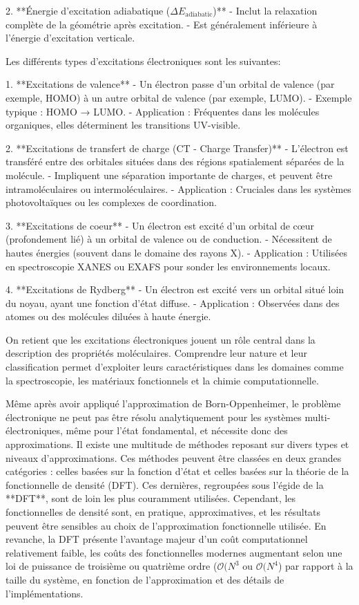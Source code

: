 \documentclass[12pt,a4paper]{report}
\numberwithin{equation}{section}
\numberwithin{figure}{section}
\numberwithin{table}{section}
\begin{document}
\begin{markdown}
2. **Énergie d'excitation adiabatique ($ \Delta E_{\text{adiabatic}} $)**
   - Inclut la relaxation complète de la géométrie après excitation.
   - Est généralement inférieure à l'énergie d'excitation verticale.

Les différents types d'excitations électroniques sont les suivantes:

1. **Excitations de valence**
   - Un électron passe d'un orbital de valence (par exemple, HOMO) à un autre orbital de valence (par exemple, LUMO).
   - Exemple typique : HOMO → LUMO.
   - Application : Fréquentes dans les molécules organiques, elles déterminent les transitions UV-visible.

2. **Excitations de transfert de charge (CT - Charge Transfer)**
   - L'électron est transféré entre des orbitales situées dans des régions spatialement séparées de la molécule.
   - Impliquent une séparation importante de charges, et peuvent être intramoléculaires ou intermoléculaires.
   - Application : Cruciales dans les systèmes photovoltaïques ou les complexes de coordination.

3. **Excitations de coeur**
   - Un électron est excité d'un orbital de cœur (profondement lié) à un orbital de valence ou de conduction.
   - Nécessitent de hautes énergies (souvent dans le domaine des rayons X).
   - Application : Utilisées en spectroscopie XANES ou EXAFS pour sonder les environnements locaux.

4. **Excitations de Rydberg**
   - Un électron est excité vers un orbital situé loin du noyau, ayant une fonction d'état diffuse.
   - Application : Observées dans des atomes ou des molécules diluées à haute énergie.

On retient que les excitations électroniques jouent un rôle central dans la description des propriétés moléculaires. Comprendre leur nature et leur classification permet d’exploiter leurs caractéristiques dans les domaines comme la spectroscopie, les matériaux fonctionnels et la chimie computationnelle.

Même après avoir appliqué l'approximation de Born-Oppenheimer, le problème électronique ne peut pas être résolu analytiquement pour les systèmes multi-électroniques, même pour l'état fondamental, et nécessite donc des approximations. Il existe une multitude de méthodes reposant sur divers types et niveaux d'approximations. Ces méthodes peuvent être classées en deux grandes catégories : celles basées sur la fonction d'état et celles basées sur la théorie de la fonctionnelle de densité (DFT). Ces dernières, regroupées sous l'égide de la **DFT**, sont de loin les plus couramment utilisées. Cependant, les fonctionnelles de densité sont, en pratique, approximatives, et les résultats peuvent être sensibles au choix de l'approximation fonctionnelle utilisée. En revanche, la DFT présente l'avantage majeur d'un coût computationnel relativement faible, les coûts des fonctionnelles modernes augmentant selon une loi de puissance de troisième ou quatrième ordre ($\mathcal{O}(N^3$ ou $\mathcal{O}(N^4$) par rapport à la taille du système, en fonction de l'approximation et des détails de l'implémentations.


\end{markdown}
\end{document}
